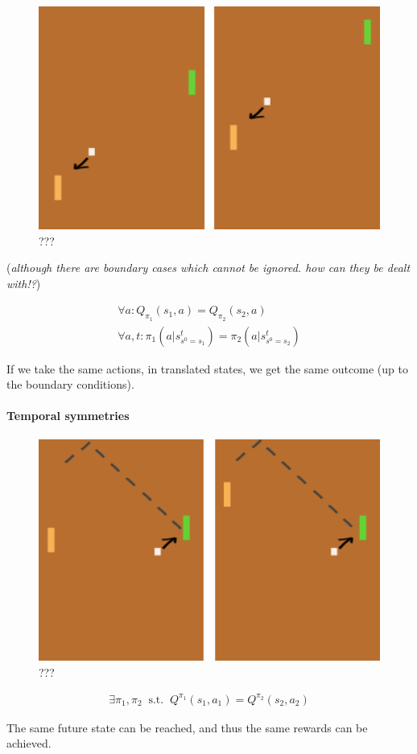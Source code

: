 \begin{figure}
\centering
\includegraphics[width=1\textwidth,height=0.25\textheight]{../../pictures/drawings/pong-trans.png}
\caption{???}
\end{figure}

(\emph{although there are boundary cases which cannot be ignored. how
can they be dealt with!?})

\begin{align}
\forall a: Q_{\pi_1}(s_1, a) = Q_{\pi_2}(s_2, a) \\
\forall a, t: \pi_1(a|s^t_{s^0=s_1}) = \pi_2(a|s^t_{s^0=s_2})
\end{align}

If we take the same actions, in translated states, we get the same
outcome (up to the boundary conditions).

\hypertarget{temporal-symmetries}{%
\paragraph{Temporal symmetries}\label{temporal-symmetries}}

\begin{figure}
\centering
\includegraphics[width=1\textwidth,height=0.25\textheight]{../../pictures/drawings/pong-reach.png}
\caption{???}
\end{figure}

\begin{align}
\exists \pi_1, \pi_2 \;\;\text{s.t.} \;\; Q^{\pi_1}(s_1, a_1) = Q^{\pi_2}(s_2, a_2)
\end{align}

The same future state can be reached, and thus the same rewards can be
achieved.

